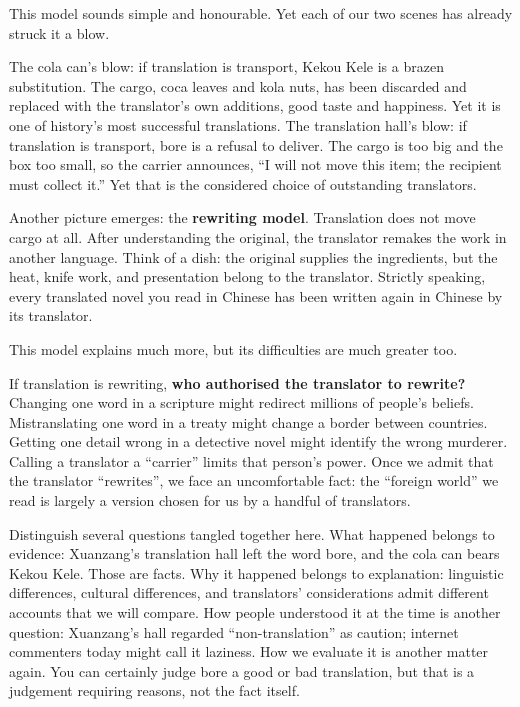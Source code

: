 This model sounds simple and honourable. Yet each of our two scenes has already struck it a blow.

The cola can's blow: if translation is transport, Kekou Kele is a brazen substitution. The cargo, coca leaves and kola nuts, has been discarded and replaced with the translator's own additions, good taste and happiness. Yet it is one of history's most successful translations. The translation hall's blow: if translation is transport, bore is a refusal to deliver. The cargo is too big and the box too small, so the carrier announces, ``I will not move this item; the recipient must collect it.'' Yet that is the considered choice of outstanding translators.

Another picture emerges: the \textbf{rewriting model}. Translation does not move cargo at all. After understanding the original, the translator remakes the work in another language. Think of a dish: the original supplies the ingredients, but the heat, knife work, and presentation belong to the translator. Strictly speaking, every translated novel you read in Chinese has been written again in Chinese by its translator.

This model explains much more, but its difficulties are much greater too.

If translation is rewriting, \textbf{who authorised the translator to rewrite?} Changing one word in a scripture might redirect millions of people's beliefs. Mistranslating one word in a treaty might change a border between countries. Getting one detail wrong in a detective novel might identify the wrong murderer. Calling a translator a ``carrier'' limits that person's power. Once we admit that the translator ``rewrites'', we face an uncomfortable fact: the ``foreign world'' we read is largely a version chosen for us by a handful of translators.

Distinguish several questions tangled together here. What happened belongs to evidence: Xuanzang's translation hall left the word bore, and the cola can bears Kekou Kele. Those are facts. Why it happened belongs to explanation: linguistic differences, cultural differences, and translators' considerations admit different accounts that we will compare. How people understood it at the time is another question: Xuanzang's hall regarded ``non-translation'' as caution; internet commenters today might call it laziness. How we evaluate it is another matter again. You can certainly judge bore a good or bad translation, but that is a judgement requiring reasons, not the fact itself.


